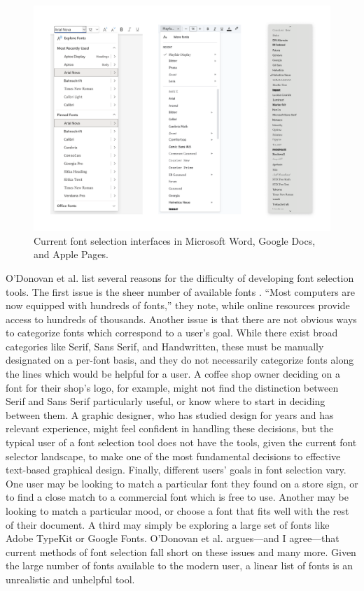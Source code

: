 \begin{figure}[h]
    \centering
    \includegraphics[width=1\textwidth]{images/font-selectors.png}
    \caption{Current font selection interfaces in Microsoft Word, Google Docs, and Apple Pages.}
    \label{fig:font-selectors}
\end{figure}

O'Donovan et al. list several reasons for the difficulty of developing font selection tools. The first issue is the sheer number of available fonts \cite{odonovan2014exploratory}. ``Most computers are now equipped with hundreds of fonts,'' they note, while online resources provide access to hundreds of thousands. Another issue is that there are not obvious ways to categorize fonts which correspond to a user's goal. While there exist broad categories like Serif, Sans Serif, and Handwritten, these must be manually designated on a per-font basis, and they do not necessarily categorize fonts along the lines which would be helpful for a user. A coffee shop owner deciding on a font for their shop's logo, for example, might not find the distinction between Serif and Sans Serif particularly useful, or know where to start in deciding between them. A graphic designer, who has studied design for years and has relevant experience, might feel confident in handling these decisions, but the typical user of a font selection tool does not have the tools, given the current font selector landscape, to make one of the most fundamental decisions to effective text-based graphical design. Finally, different users' goals in font selection vary. One user may be looking to match a particular font they found on a store sign, or to find a close match to a commercial font which is free to use. Another may be looking to match a particular mood, or choose a font that fits well with the rest of their document. A third may simply be exploring a large set of fonts like Adobe TypeKit or Google Fonts. O'Donovan et al. argues—and I agree—that current methods of font selection fall short on these issues and many more. Given the large number of fonts available to the modern user, a linear list of fonts is an  unrealistic and unhelpful tool.

